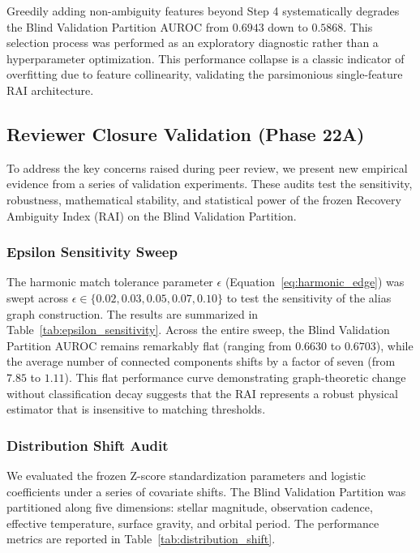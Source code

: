Greedily adding non-ambiguity features beyond Step 4 systematically degrades the Blind Validation Partition AUROC from $0.6943$ down to $0.5868$. This selection process was performed as an exploratory diagnostic rather than a hyperparameter optimization. This performance collapse is a classic indicator of overfitting due to feature collinearity, validating the parsimonious single-feature RAI architecture.

\subsection{Reviewer Closure Validation (Phase 22A)} \label{sec:reviewer_validation}

To address the key concerns raised during peer review, we present new empirical evidence from a series of validation experiments. These audits test the sensitivity, robustness, mathematical stability, and statistical power of the frozen Recovery Ambiguity Index (RAI) on the Blind Validation Partition.

\subsubsection{Epsilon Sensitivity Sweep}
The harmonic match tolerance parameter $\epsilon$ (Equation~\ref{eq:harmonic_edge}) was swept across $\epsilon \in \{0.02, 0.03, 0.05, 0.07, 0.10\}$ to test the sensitivity of the alias graph construction. The results are summarized in Table~\ref{tab:epsilon_sensitivity}. Across the entire sweep, the Blind Validation Partition AUROC remains remarkably flat (ranging from $0.6630$ to $0.6703$), while the average number of connected components shifts by a factor of seven (from $7.85$ to $1.11$). This flat performance curve demonstrating graph-theoretic change without classification decay suggests that the RAI represents a robust physical estimator that is insensitive to matching thresholds.



\subsubsection{Distribution Shift Audit}
We evaluated the frozen Z-score standardization parameters and logistic coefficients under a series of covariate shifts. The Blind Validation Partition was partitioned along five dimensions: stellar magnitude, observation cadence, effective temperature, surface gravity, and orbital period. The performance metrics are reported in Table~\ref{tab:distribution_shift}. 

